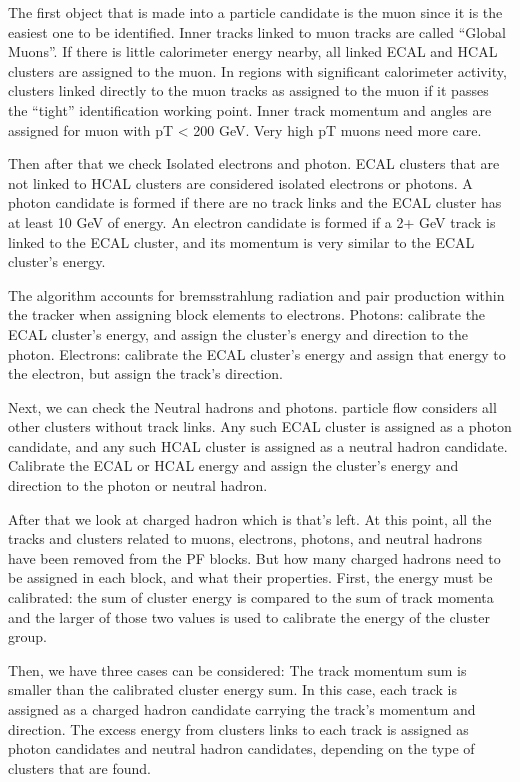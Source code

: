 The first object that is made into a particle candidate is the muon since it is the easiest one to be identified. Inner tracks linked to muon tracks are called “Global Muons”. If there is little calorimeter energy nearby, all linked ECAL and HCAL clusters are assigned to the muon. In regions with significant calorimeter activity, clusters linked directly to the muon tracks as assigned to the muon if it passes the “tight” identification working point. Inner track momentum and angles are assigned for muon with pT < 200 GeV. Very high pT muons need more care.  

Then after that we check Isolated electrons and photon. ECAL clusters that are not linked to HCAL clusters are considered isolated electrons or photons.  A photon candidate is formed if there are no track links and the ECAL cluster has at least 10 GeV of energy.  An electron candidate is formed if a 2+ GeV track is linked to the ECAL cluster, and its momentum is very similar to the ECAL cluster’s energy.   

The algorithm accounts for bremsstrahlung radiation and pair production within the tracker when assigning block elements to electrons. Photons: calibrate the ECAL cluster’s energy, and assign the cluster’s energy and direction to the photon. Electrons: calibrate the ECAL cluster’s energy and assign that energy to the electron, but assign the track’s direction. 

Next, we can check the Neutral hadrons and photons. particle flow considers all other clusters without track links. Any such ECAL cluster is assigned as a photon candidate, and any such HCAL cluster is assigned as a neutral hadron candidate. Calibrate the ECAL or HCAL energy and assign the cluster’s energy and direction to the photon or neutral hadron. 

After that we look at charged hadron which is that’s left. At this point, all the tracks and clusters related to muons, electrons, photons, and neutral hadrons have been removed from the PF blocks.  But how many charged hadrons need to be assigned in each block, and what their properties. First, the energy must be calibrated: the sum of cluster energy is compared to the sum of track momenta and the larger of those two values is used to calibrate the energy of the cluster group.   

Then, we have three cases can be considered: The track momentum sum is smaller than the calibrated cluster energy sum. In this case, each track is assigned as a charged hadron candidate carrying the track’s momentum and direction. The excess energy from clusters links to each track is assigned as photon candidates and neutral hadron candidates, depending on the type of clusters that are found.  

